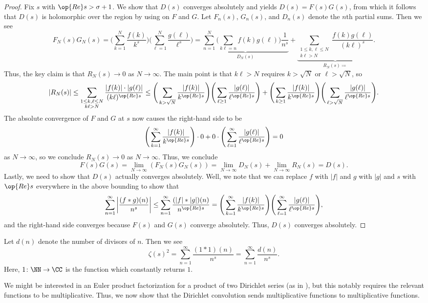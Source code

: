 \documentclass[../notes.tex]{subfiles}
\begin{document}
\begin{proof}
	Fix $s$ with $\op{Re}s>\sigma+1$. We show that $D(s)$ converges absolutely and yields $D(s)=F(s)G(s)$, from which it follows that $D(s)$ is holomorphic over the region by using  on $F$ and $G$. Let $F_n(s)$, $G_n(s)$, and $D_n(s)$ denote the $n$th partial sums. Then we see
	\[F_N(s)G_N(s)=\Bigg(\sum_{k=1}^N\frac{f(k)}{k^s}\Bigg)\Bigg(\sum_{\ell=1}^N\frac{g(\ell)}{\ell^s}\Bigg)=\underbrace{\sum_{n=1}^N\Bigg(\sum_{k\ell=n}f(k)g(\ell)\Bigg)\frac1{n^s}}_{D_N(s)}+\underbrace{\sum_{\substack{1\le k,\ell\le N\\k\ell>N}}\frac{f(k)g(\ell)}{(k\ell)^s}}_{R_N(s)\coloneqq}.\]
	Thus, the key claim is that $R_N(s)\to0$ as $N\to\infty$. The main point is that $k\ell>N$ requires $k>\sqrt N$ or $\ell>\sqrt N$, so
	\[|R_N(s)|\le\sum_{\substack{1\le k,\ell\le N\\k\ell>N}}\frac{|f(k)|\cdot|g(\ell)|}{(k\ell)^{\op{Re}s}}\le\Bigg(\sum_{k>\sqrt N}\frac{|f(k)|}{k^{\op{Re}s}}\Bigg)\Bigg(\sum_{\ell\ge1}\frac{|g(\ell)|}{\ell^{\op{Re}s}}\Bigg)+\Bigg(\sum_{k\ge1}\frac{|f(k)|}{k^{\op{Re}s}}\Bigg)\Bigg(\sum_{\ell>\sqrt N}\frac{|g(\ell)|}{\ell^{\op{Re}s}}\Bigg).\]
	The absolute convergence of $F$ and $G$ at $s$ now causes the right-hand side to be
	\[\Bigg(\sum_{k=1}^\infty\frac{|f(k)|}{k^{\op{Re}s}}\Bigg)\cdot0+0\cdot\Bigg(\sum_{\ell=1}^\infty\frac{|g(\ell)|}{\ell^{\op{Re}s}}\Bigg)=0\]
	as $N\to\infty$, so we conclude $R_N(s)\to0$ as $N\to\infty$. Thus, we conclude
	\[F(s)G(s)=\lim_{N\to\infty}(F_N(s)G_N(s))=\lim_{N\to\infty}D_N(s)+\lim_{N\to\infty}R_N(s)=D(s).\]
	Lastly, we need to show that $D(s)$ actually converges absolutely. Well, we note that we can replace $f$ with $|f|$ and $g$ with $|g|$ and $s$ with $\op{Re}s$ everywhere in the above bounding to show that
	\[\sum_{n=1}^\infty\left|\frac{(f*g)(n)}{n^s}\right|\le\sum_{n=1}^\infty\frac{(|f|*|g|)(n)}{n^{\op{Re}s}}=\Bigg(\sum_{k=1}^\infty\frac{|f(k)|}{k^{\op{Re}s}}\Bigg)\Bigg(\sum_{\ell=1}^\infty\frac{|g(\ell)|}{\ell^{\op{Re}s}}\Bigg),\]
	and the right-hand side converges because $F(s)$ and $G(s)$ converge absolutely. Thus, $D(s)$ converges absolutely.
\end{proof}
\begin{example}
	Let $d(n)$ denote the number of divisors of $n$. Then we see
	\[\zeta(s)^2=\sum_{n=1}^\infty\frac{(1*1)(n)}{n^s}=\sum_{n=1}^\infty\frac{d(n)}{n^s}.\]
	Here, $1\colon\NN\to\CC$ is the function which constantly returns $1$.
\end{example}
We might be interested in an Euler product factorization for a product of two Dirichlet series (as in ), but this notably requires the relevant functions to be multiplicative. Thus, we now show that the Dirichlet convolution sends multiplicative functions to multiplicative functions.
\end{document}
